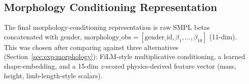\subsection{Morphology Conditioning Representation}
\label{sec:method:morphology}

The final morphology-conditioning representation is raw SMPL betas concatenated with gender,
$\mathrm{morphology\_obs} = [\text{gender\_id}, \beta_1, \ldots, \beta_{10}]$ (11-dim). This was
chosen after comparing against three alternatives (Section~\ref{sec:exp:morphology}):
FiLM-style multiplicative conditioning, a learned shape-embedding, and a 15-dim
$z$-scored physics-derived feature vector (mass, height, limb-length-style scalars).
